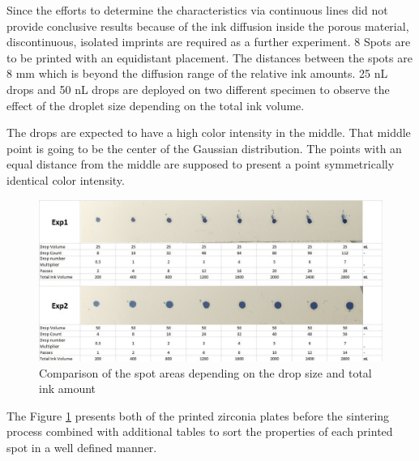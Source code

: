 Since the efforts to determine the characteristics via continuous lines did not provide conclusive results because of the ink diffusion inside the porous material, discontinuous, isolated imprints are required as a further experiment. 8 Spots are to be printed with an equidistant placement. The distances between the spots are 8 mm which is beyond the diffusion range of the relative ink amounts. 25 nL drops and 50 nL drops are deployed on two different specimen to observe the effect of the droplet size depending on the total ink volume. 

The drops are expected to have a high color intensity in the middle. That middle point is going to be the center of the Gaussian distribution. The points with an equal distance from the middle are supposed to present a point symmetrically identical color intensity.

\bigskip

\begin{figure}[H]
	\centering
	\includegraphics[width=1\textwidth]{grafiken/psfprint.jpg}
	\caption{Comparison of the spot areas depending on the drop size and total ink amount}
	\label{fig:psfprint}
\end{figure} 

\bigskip

The Figure \ref{fig:psfprint} presents both of the printed zirconia plates before the sintering process combined with additional tables to sort the properties of each printed spot in a well defined manner. 

